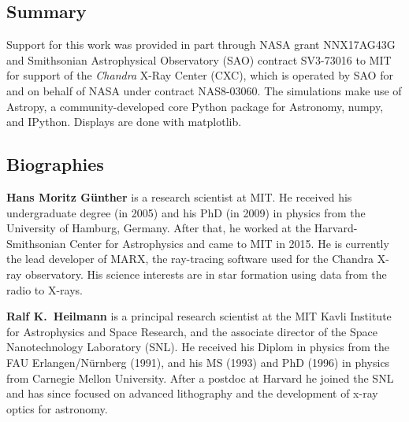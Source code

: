 \documentclass[12pt]{spieman}  %
\begin{document}
\begin{spacing}{1}

\section{Summary}


\acknowledgments
Support for this work was provided in part through NASA grant NNX17AG43G and Smithsonian Astrophysical Observatory (SAO)
contract SV3-73016 to MIT for support of the {\em Chandra} X-Ray Center (CXC),
which is operated by SAO for and on behalf of NASA under contract NAS8-03060.
The simulations make use of Astropy, a community-developed core Python package
for Astronomy\cite{2013A&A...558A..33A,astropy}, numpy\cite{numpy}, and
IPython\cite{IPython}. Displays are done with matplotlib\cite{matplotlib}.


\subsection*{Biographies}
\vspace{2ex}\noindent\textbf{Hans Moritz G\"unther} is a research scientist at MIT. He received his undergraduate degree (in 2005) and his PhD (in 2009) in physics from the University of Hamburg, Germany. After that, he worked at the Harvard-Smithsonian Center for Astrophysics and came to MIT in 2015. He is currently the lead developer of MARX, the ray-tracing software used for the Chandra X-ray observatory. His science interests are in star formation using data from the radio to X-rays.

\vspace{1ex}
\vspace{2ex}\noindent\textbf{Ralf K.~Heilmann} is a principal research scientist at the MIT Kavli Institute for Astrophysics and Space Research, and the associate director of the Space Nanotechnology Laboratory (SNL).  He received his Diplom in physics from the FAU Erlangen/N\"urnberg (1991), and his MS (1993) and PhD (1996) in physics from Carnegie Mellon University.  After a postdoc at Harvard he joined the SNL and has since focused on advanced lithography and the development of x-ray optics for astronomy.



\appendix    %






\listoffigures
\listoftables

\end{spacing}
\end{document}
